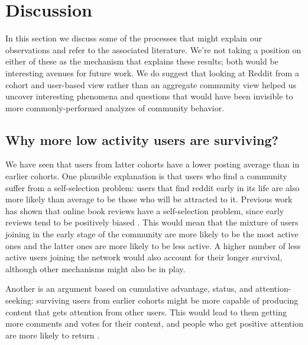\section{Discussion}

In this section we discuss some of the processes that might explain our observations and refer to the associated literature. We're not taking a position on either of these as the mechanism that explains these results; both would be interesting avenues for future work.  We do suggest that looking at Reddit from a cohort and user-based view rather than an aggregate community view helped us uncover interesting phenomena and questions that would have been invisible to more commonly-performed analyzes of community behavior. 

\subsection{Why more low activity users are surviving?}

We have seen that users from latter cohorts have a lower posting average than in earlier cohorts. 
One plausible explanation is that users who find a community suffer from a self-selection problem: users that find reddit early in its life are also more likely than average to be those who will be attracted to it. Previous work has shown that online book reviews have a self-selection problem, since early reviews tend to be positively biased \cite{Li2008}. This would mean that the mixture of users joining in the early stage of the community are more likely to be the most active ones and the latter ones are more likely to be less active. A higher number of less active users joining the network would also account for their longer survival, although other mechanisms might also be in play.

Another is an argument based on cumulative advantage, status, and attention-seeking: surviving users from earlier cohorts might be more capable of producing content that gets attention from other users.  This would lead to them getting more comments and votes for their content, and people who get positive attention are more likely to return \cite{Halfaker2009, Choi2010, Sarkar2012}.  

